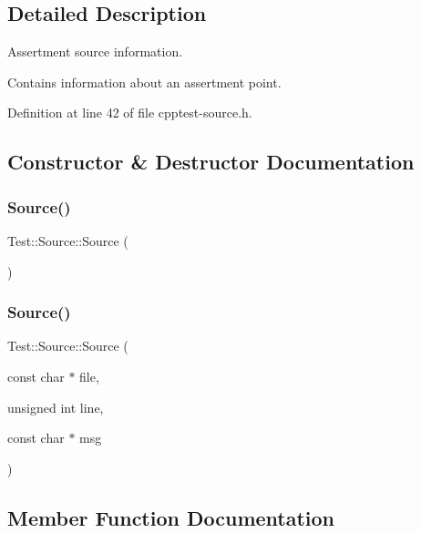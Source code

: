 \subsection{Detailed Description}
Assertment source information. 

Contains information about an assertment point. 

Definition at line 42 of file cpptest-\/source.\+h.



\subsection{Constructor \& Destructor Documentation}
\mbox{\label{class_test_1_1_source_abe0f303fe92270aa12a4a749ae0395ef}} 
\subsubsection{\texorpdfstring{Source()}{Source()}\hspace{0.1cm}{\footnotesize\ttfamily [1/2]}}
{\footnotesize\ttfamily Test\+::\+Source\+::\+Source (\begin{DoxyParamCaption}{ }\end{DoxyParamCaption})}

\mbox{\label{class_test_1_1_source_ac764beb685a574b81527d0f90ae9e428}} 
\subsubsection{\texorpdfstring{Source()}{Source()}\hspace{0.1cm}{\footnotesize\ttfamily [2/2]}}
{\footnotesize\ttfamily Test\+::\+Source\+::\+Source (\begin{DoxyParamCaption}\item[{const char $\ast$}]{file,  }\item[{unsigned int}]{line,  }\item[{const char $\ast$}]{msg }\end{DoxyParamCaption})}



\subsection{Member Function Documentation}
\mbox{\label{class_test_1_1_source_a5244b21c0aae95eab1c87f69ab108a2d}} 
